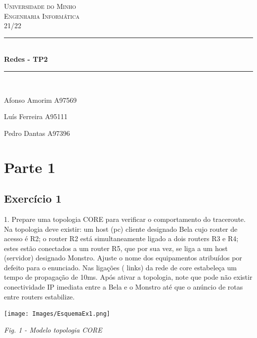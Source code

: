 \documentclass{article}
\begin{document}
	\begin{centering}
    \vspace*{0.5 cm}
    \textsc{\LARGE Universidade do Minho}\\[2.0 cm]	%
	\textsc{\LARGE Engenharia Informática}\\[1 cm]				%
	\textsc{\large 21/22}\\[0.5 cm]				%
	\rule{\linewidth}{0.2 mm} \\[0.4 cm]
	{ \huge \bfseries Redes - TP2}
	\rule{\linewidth}{0.2 mm} \\[1.5 cm]
		\begin{minipage}{0.4\textwidth}
		\begin{flushright}\large
		\begin{raggedright}
		Afonso Amorim A97569\par
		Luís Ferreira A95111\par
		Pedro Dantas  A97396\par
		\end{raggedright}
		\end{flushright}
	\end{minipage}
	\end{centering}
\clearpage
\tableofcontents
\cleardoublepage
\section{Parte 1}
\subsection{Exercício 1}
1. Prepare uma topologia CORE para verificar o comportamento do
traceroute. Na topologia deve existir: um host (pc) cliente designado Bela cujo router de acesso é R2; o router R2 está simultaneamente ligado a dois routers R3 e R4; estes estão conectados a um router R5, que por sua vez, se liga a um host (servidor) designado Monstro. Ajuste o nome dos equipamentos atribuídos por defeito para o enunciado. Nas ligações ( links) da rede de core estabeleça um tempo de propagação de 10ms. Após ativar a topologia, note que pode não existir conectividade IP imediata entre a Bela e o Monstro até que o anúncio de rotas entre routers estabilize.

\begin{center}
\texttt{[image: Images/EsquemaEx1.png]}
\caption{\textit{Fig. 1 - Modelo topologia CORE}}
\vspace{1.5 cm}
\end{center}
\end{document}
